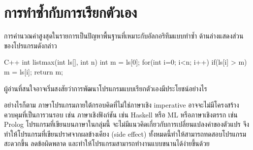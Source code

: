 \section{การ{\wbr}ทำ{\wbr}ซ้ำ{\wbr}กับ{\wbr}การ{\wbr}เรียก{\wbr}ตัวเอง}
การ{\wbr}คำนวณ{\wbr}ค่าสูงสุด{\wbr}ใน{\wbr}รายการ{\wbr}เป็น{\wbr}ปัญหา{\wbr}พื้นฐาน{\wbr}ที่{\wbr}เหมาะ{\wbr}กับ{\wbr}อัล{\wbr}กอ{\wbr}ริ{\wbr}ทึม{\wbr}แบบ{\wbr}ทำ{\wbr}ซ้ำ ด้าน{\wbr}ล่าง{\wbr}แสดง{\wbr}ส่วน{\wbr}ของ{\wbr}โปรแกรม{\wbr}ดังกล่าว{\wbr}

\latintext
\begin{codelist}{C++}
int listmax(int ls[], int n)
{
  int m = ls[0];
  for(int i=0; i<n; i++)
    if(ls[i] > m)
      m = ls[i];
  return m;
}
\end{codelist}
\thaitext

ผู้อ่าน{\wbr}ที่{\wbr}สนใจ{\wbr}อาจ{\wbr}เริ่ม{\wbr}สงสัย{\wbr}ว่า{\wbr}การ{\wbr}พัฒนา{\wbr}โปรแกรม{\wbr}แบบ{\wbr}เรียก{\wbr}ตัวเอง{\wbr}มี{\wbr}ประโยชน์{\wbr}อย่างไร 


อย่างไรก็ตาม ภาษา{\wbr}โปรแกรม{\wbr}ภายใต้{\wbr}กรอบ{\wbr}คิด{\wbr}ที่{\wbr}ไม่{\wbr}ใช่{\wbr}ภาษา{\wbr}เชิง imperative
อาจ{\wbr}จะ{\wbr}ไม่{\wbr}มี{\wbr}โครงสร้าง{\wbr}ควบคุม{\wbr}ที่{\wbr}เป็น{\wbr}การ{\wbr}วน{\wbr}รอบ เช่น ภาษา{\wbr}เชิง{\wbr}ฟังก์ชัน เช่น Haskell หรือ ML
หรือ{\wbr}ภาษา{\wbr}เชิง{\wbr}ตรรก เช่น Prolog โปรแกรม{\wbr}ที่{\wbr}เขียน{\wbr}บน{\wbr}ภาษา{\wbr}ใน{\wbr}กลุ่ม{\wbr}นี้{\wbr}
จะ{\wbr}ไม่{\wbr}มี{\wbr}แนว{\wbr}คิด{\wbr}เกี่ยวกับ{\wbr}การ{\wbr}เปลี่ยนแปลง{\wbr}ค่า{\wbr}ของ{\wbr}ตัวแปร{\wbr}
จึง{\wbr}ทำ{\wbr}ให้{\wbr}โปรแกรม{\wbr}ที่{\wbr}เขียน{\wbr}ปราศจาก{\wbr}ผลข้างเคียง (side effect)
ทั้งหมด{\wbr}นี้{\wbr}ทำ{\wbr}ให้{\wbr}สามารถ{\wbr}ทดสอบ{\wbr}โปรแกรม{\wbr}สะดวก{\wbr}ขึ้น ลด{\wbr}ข้อผิดพลาด{\wbr}
และ{\wbr}ทำ{\wbr}ให้{\wbr}โปรแกรม{\wbr}สามารถ{\wbr}ทำงาน{\wbr}แบบ{\wbr}ขนาน{\wbr}ได้{\wbr}ง่าย{\wbr}ขึ้น{\wbr}ด้วย{\wbr}




